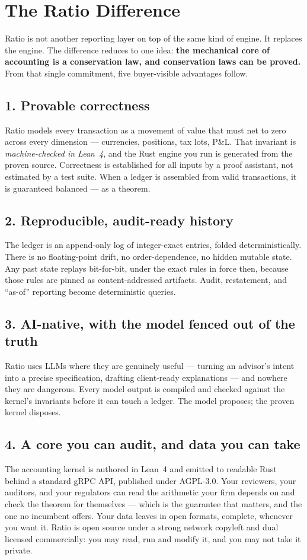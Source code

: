 \section{The Ratio Difference}

Ratio is not another reporting layer on top of the same kind of engine. It
replaces the engine. The difference reduces to one idea: \textbf{the mechanical
core of accounting is a conservation law, and conservation laws can be proved.}
From that single commitment, five buyer-visible advantages follow.



\subsection{1. Provable correctness}
Ratio models every transaction as a movement of value that must net to zero
across every dimension --- currencies, positions, tax lots, P\&L. That invariant
is \emph{machine-checked in Lean~4}, and the Rust engine you run is generated
from the proven source. Correctness is established for all inputs by a proof
assistant, not estimated by a test suite. When a ledger is assembled from valid
transactions, it is guaranteed balanced --- as a theorem.

\subsection{2. Reproducible, audit-ready history}
The ledger is an append-only log of integer-exact entries, folded
deterministically. There is no floating-point drift, no order-dependence, no
hidden mutable state. Any past state replays bit-for-bit, under the exact rules
in force then, because those rules are pinned as content-addressed artifacts.
Audit, restatement, and ``as-of'' reporting become deterministic queries.

\subsection{3. AI-native, with the model fenced out of the truth}
Ratio uses LLMs where they are genuinely useful --- turning an advisor's intent
into a precise specification, drafting client-ready explanations --- and nowhere
they are dangerous. Every model output is compiled and checked against the
kernel's invariants before it can touch a ledger. The model proposes; the proven
kernel disposes.

\subsection{4. A core you can audit, and data you can take}
The accounting kernel is authored in Lean~4 and emitted to readable Rust behind
a standard gRPC API, published under AGPL-3.0. Your reviewers,
your auditors, and your regulators can read the arithmetic your firm depends on
and check the theorem for themselves --- which is the guarantee that matters,
and the one no incumbent offers. Your data leaves in open formats, complete,
whenever you want it. Ratio is open source under a strong network copyleft and
dual licensed commercially: you may read, run and modify it, and you may not
take it private.

